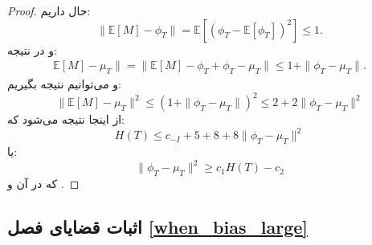 \documentclass[a4paper,12pt]{article}
\newcommand{\E}{\mathbb{E}}
\begin{document}
\begin{proof}
		حال داریم:
		\begin{equation}
		\| \E[M] - \phi_T\| =  \E[ (\phi_T - \E[\phi_T])^2] \leq 1.
		\end{equation}
		و در نتیجه:
		\begin{align}
		\E[M] - \mu_T \| =  \|  \E[M]-\phi_T + \phi_T - \mu_T \| \leq 1 +\| \phi_T - \mu_T \|.
		\end{align}
		و می‌توانیم نتیجه بگیریم:
		\begin{equation}
		\|  \E[M] - \mu_T \|^2 \leq  (1 +\| \phi_T - \mu_T \|)^2 \leq 2+ 2\| \phi_T - \mu_T \|^2
		\end{equation}
		از اینجا نتیجه می‌شود که:
		\begin{equation}
		H(T) \leq c_{-I} + 5+ 8 + 8\| \phi_T - \mu_T \|^2
		\end{equation}
		یا:
		\begin{equation}
		\| \phi_T - \mu_T \|^2 \geq c_1 H(T)- c_2
		\end{equation}
		که در آن
		و
		.
	\end{proof}
	\subsection{اثبات قضایای فصل
		\ref{when_bias_large}}
\end{document}
